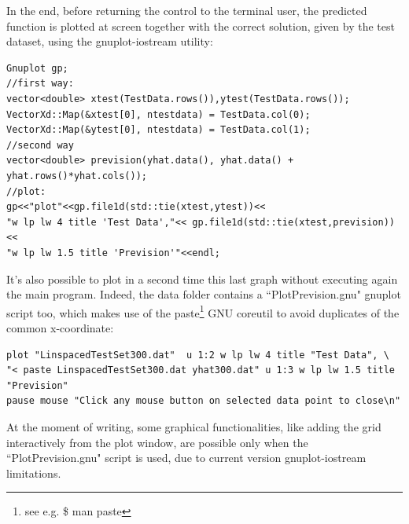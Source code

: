 \documentclass[12pt, a4paper]{report}
\theoremstyle{definition}
\begin{document}
In the end, before returning the control to the terminal user, the predicted function is plotted at screen together with the correct solution, given by the test dataset, using the gnuplot-iostream utility:
\begin{lstlisting}[frame=single, showstringspaces=false]
Gnuplot gp;
//first way:
vector<double> xtest(TestData.rows()),ytest(TestData.rows());
VectorXd::Map(&xtest[0], ntestdata) = TestData.col(0);
VectorXd::Map(&ytest[0], ntestdata) = TestData.col(1);
//second way
vector<double> prevision(yhat.data(), yhat.data() + yhat.rows()*yhat.cols());
//plot:
gp<<"plot"<<gp.file1d(std::tie(xtest,ytest))<<
"w lp lw 4 title 'Test Data',"<< gp.file1d(std::tie(xtest,prevision))<<
"w lp lw 1.5 title 'Prevision'"<<endl;
\end{lstlisting}
It's also possible to plot in a second time this last graph without executing again the main program. Indeed, the data folder contains a ``PlotPrevision.gnu" gnuplot script too, which makes use of the {\ttfamily paste}\footnote{ see e.g. {\ttfamily \$ man paste}} GNU coreutil to avoid duplicates of the common x-coordinate:
\begin{lstlisting}[frame=single, showstringspaces=false]
plot "LinspacedTestSet300.dat"	u 1:2 w lp lw 4 title "Test Data", \
"< paste LinspacedTestSet300.dat yhat300.dat" u 1:3 w lp lw 1.5 title "Prevision"
pause mouse "Click any mouse button on selected data point to close\n"
\end{lstlisting}
At the moment of writing, some graphical functionalities, like adding the grid interactively from the plot window, are possible only when the ``PlotPrevision.gnu" script is used, due to current version gnuplot-iostream limitations.


\end{document}
